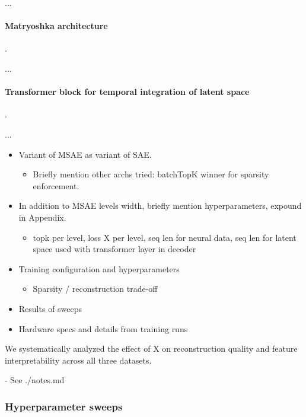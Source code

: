 ...

\paragraph{Matryoshka architecture}.

...

\paragraph{Transformer block for temporal integration of latent space}.

...

\begin{itemize}
    
    \item Variant of MSAE as variant of SAE.
    \begin{itemize}
        \item Briefly mention other archs tried: batchTopK winner for sparsity enforcement.
    \end{itemize}
    
    \item In addition to MSAE levels width, briefly mention hyperparameters, expound in Appendix.
    \begin{itemize}
        \item topk per level, loss X per level, seq len for neural data, seq len for latent space used with transformer layer in decoder
    \end{itemize}

\end{itemize}

\begin{itemize}
    \item Training configuration and hyperparameters
    \begin{itemize}
        \item Sparsity / reconstruction trade-off
    \end{itemize}
    \item Results of sweeps
    \item Hardware specs and details from training runs
\end{itemize}

We systematically analyzed the effect of X on reconstruction quality and feature interpretability across all three datasets.

- See ./notes.md

\subsubsection{Hyperparameter sweeps}
\label{subsubsection:hyperparameter_sweeps}

